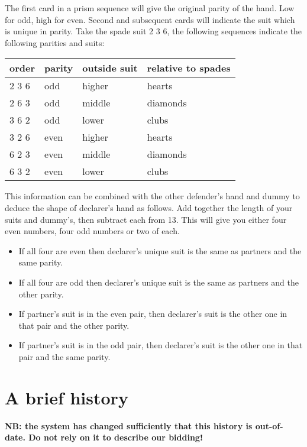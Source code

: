\documentclass[a4paper,14pt]{extarticle}
\begin{document}
The first card in a prism sequence will give the original parity of the hand.
Low for odd, high for even. Second and subsequent cards will indicate the suit
which is unique in parity. Take the spade suit 2 3 6, the following sequences indicate
the following parities and suits:

\begin{tabular}{llll}
\bf order & \bf parity & \bf outside suit & \bf relative to spades \\
\hline
2 3 6 & odd    & higher       & hearts \\
2 6 3 & odd    & middle       & diamonds \\
3 6 2 & odd    & lower        & clubs \\
3 2 6 & even   & higher       & hearts \\
6 2 3 & even   & middle       & diamonds \\
6 3 2 & even   & lower        & clubs \\
\end{tabular}

This information can be combined with the other defender's hand and dummy to
deduce the shape of declarer's hand as follows. Add together the length of your
suits and dummy's, then subtract each from 13. This will give you either four
even numbers, four odd numbers or two of each.

\begin{itemize}
\item If all four are even then declarer's unique suit is the same as partners and the same parity.
\item If all four are odd then declarer's unique suit is the same as partners and the other parity.
\item If partner's suit is in the even pair, then declarer's suit is the other one in that pair and the other parity.
\item If partner's suit is in the odd pair, then declarer's suit is the other one in that pair and the same parity.
\end{itemize}

\newpage

\section{A brief history}
\label{sec:history}

{\bf NB: the system has changed sufficiently that this history is out-of-date.  Do
not rely on it to describe our bidding! }
\end{document}
